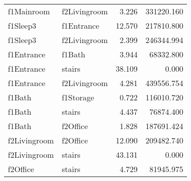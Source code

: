 \begin{tabular}{llrr}
     f1Mainroom &    f2Livingroom &                        3.226 &                   331220.160 \\
       f1Sleep3 &      f1Entrance &                       12.570 &                   217810.800 \\
       f1Sleep3 &    f2Livingroom &                        2.399 &                   246344.994 \\
     f1Entrance &          f1Bath &                        3.944 &                    68332.800 \\
     f1Entrance &          stairs &                       38.109 &                        0.000 \\
     f1Entrance &    f2Livingroom &                        4.281 &                   439556.754 \\
         f1Bath &       f1Storage &                        0.722 &                   116010.720 \\
         f1Bath &          stairs &                        4.437 &                    76874.400 \\
         f1Bath &        f2Office &                        1.828 &                   187691.424 \\
   f2Livingroom &        f2Office &                       12.090 &                   209482.740 \\
   f2Livingroom &          stairs &                       43.131 &                        0.000 \\
       f2Office &          stairs &                        4.729 &                    81945.975 \\
\bottomrule
\end{tabular}
